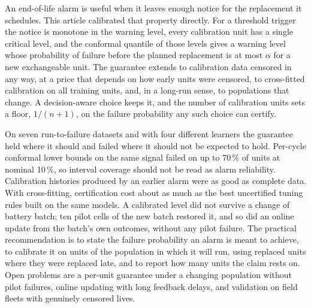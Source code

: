 An end-of-life alarm is useful when it leaves enough notice for the replacement it schedules. This article calibrated that property directly. For a threshold trigger the notice is monotone in the warning level, every calibration unit has a single critical level, and the conformal quantile of those levels gives a warning level whose probability of failure before the planned replacement is at most $\alpha$ for a new exchangeable unit. The guarantee extends to calibration data censored in any way, at a price that depends on how early units were censored, to cross-fitted calibration on all training units, and, in a long-run sense, to populations that change. A decision-aware choice keeps it, and the number of calibration units sets a floor, $1/(n+1)$, on the failure probability any such choice can certify.

On seven run-to-failure datasets and with four different learners the guarantee held where it should and failed where it should not be expected to hold. Per-cycle conformal lower bounds on the same signal failed on up to 70\,\% of units at nominal 10\,\%, so interval coverage should not be read as alarm reliability. Calibration histories produced by an earlier alarm were as good as complete data. With cross-fitting, certification cost about as much as the best uncertified tuning rules built on the same models. A calibrated level did not survive a change of battery batch; ten pilot cells of the new batch restored it, and so did an online update from the batch's own outcomes, without any pilot failure. The practical recommendation is to state the failure probability an alarm is meant to achieve, to calibrate it on units of the population in which it will run, using replaced units where they were replaced late, and to report how many units the claim rests on. Open problems are a per-unit guarantee under a changing population without pilot failures, online updating with long feedback delays, and validation on field fleets with genuinely censored lives.
